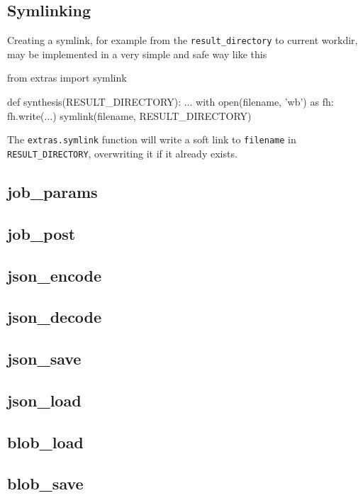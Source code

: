 \subsection{Symlinking}
Creating a symlink, for example from the \texttt{result\_directory} to
current workdir, may be implemented in a very simple and safe way like
this
\begin{python}
from extras import symlink

def synthesis(RESULT_DIRECTORY):
    ...
    with open(filename, 'wb') as fh:
         fh.write(...)
    symlink(filename, RESULT_DIRECTORY)
\end{python}
The \texttt{extras.symlink} function will write a soft link
to \texttt{filename} in \texttt{RESULT\_DIRECTORY}, overwriting it if
it already exists.

\subsection{job\_params}

\subsection{job\_post}

\subsection{json\_encode}

\subsection{json\_decode}

\subsection{json\_save}

\subsection{json\_load}

\subsection{blob\_load}

\subsection{blob\_save}

